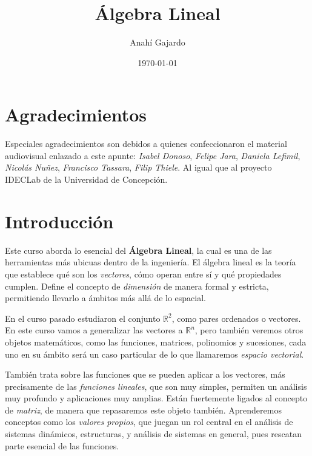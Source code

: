 \documentclass[12pt]{book}
\title{Álgebra Lineal}
\author{Anahí Gajardo}
\date{\today}
\def\R{\mathbb{R}}
\begin{document}
\maketitle
\frontmatter
\chapter{Agradecimientos}

Especiales agradecimientos son debidos a quienes confeccionaron el material audiovisual enlazado a este apunte: {\em Isabel Donoso}, {\em Felipe Jara}, {\em Daniela Lefimil}, {\em Nicolás Nuñez}, {\em Francisco Tassara}, {\em Filip Thiele}. Al igual que al proyecto IDECLab de la Universidad de Concepción.

\tableofcontents
\mainmatter



\chapter{Introducción}


Este curso aborda lo esencial del {\bf Álgebra Lineal}, la cual es una de las herramientas más ubicuas dentro de la ingeniería.
El álgebra lineal es la teoría que establece qué son los \emph{vectores}, cómo operan entre sí y qué propiedades cumplen. Define el concepto de \emph{dimensión} de manera formal y estricta, permitiendo llevarlo a ámbitos más allá de lo espacial.

En el curso pasado estudiaron el conjunto $\R^2$, como pares ordenados o vectores. 
En este curso vamos a generalizar las vectores a $\R^n$, pero también veremos otros objetos matemáticos, como las funciones, matrices, polinomios y sucesiones, cada uno en su ámbito será un caso particular de lo que llamaremos \emph{espacio vectorial}.

También trata sobre las funciones que se pueden aplicar a los vectores, más precisamente de las \emph{funciones lineales}, que son muy simples, permiten un análisis muy profundo y aplicaciones muy amplias.
Están fuertemente ligados al concepto de \emph{matriz}, de manera que repasaremos este objeto también.
Aprenderemos conceptos como los \emph{valores propios}, que juegan un rol central en el análisis de sistemas dinámicos, estructuras, y análisis de sistemas en general, pues rescatan parte esencial de las funciones.
\end{document}
